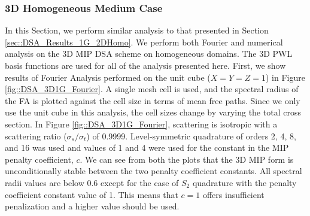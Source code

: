 \subsubsection{3D Homogeneous Medium Case}
\label{sec::DSA_Results_1G_3DHomo}


In this Section, we perform similar analysis to that presented in Section \ref{sec::DSA_Results_1G_2DHomo}. We perform both Fourier and numerical analysis on the 3D MIP DSA scheme on homogeneous domains. The 3D PWL basis functions are used for all of the analysis presented here. First, we show results of Fourier Analysis performed on the unit cube ($X=Y=Z=1$) in Figure \ref{fig::DSA_3D1G_Fourier}. A single mesh cell is used, and the spectral radius of the FA is plotted against the cell size in terms of mean free paths. Since we only use the unit cube in this analysis, the cell sizes change by varying the total cross section. In Figure \ref{fig::DSA_3D1G_Fourier}, scattering is isotropic with a scattering ratio ($\sigma_s/\sigma_t$) of 0.9999. Level-symmetric quadrature of orders 2, 4, 8, and 16 was used and values of 1 and 4 were used for the constant in the MIP penalty coefficient, $c$. We can see from both the plots that the 3D MIP form is unconditionally stable between the two penalty coefficient constants. All spectral radii values are below 0.6 except for the case of $S_2$ quadrature with the penalty coefficient constant value of 1. This means that $c=1$ offers insufficient penalization and a higher value should be used.


